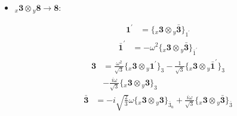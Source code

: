 \documentclass[english]{article}
\newcommand{\rep}[1]{\mathbf{#1}}
\newcommand{\repx}[2]{{}_{#2}\mathbf{#1}}
\newcommand{\tsprodx}[2]{\repx{#1}{x}\otimes\repx{#2}{y}}
\newcommand{\subcgt}[3]{\big\{ \tsprodx{#1}{#2}\big\}^{}_{#3}}
\begin{document}
\begin{itemize}
\begin{fleqn}
\end{fleqn}
\item $\tsprodx{3}{8}\to\rep{8}$:
\begin{fleqn}
\begin{align*}
\rep{1^{\prime}} & = \subcgt{3}{\bar{3}}{1^{\prime}}
\end{align*}
\begin{align*}
\rep{\bar{1}^{\prime}} & = -\omega ^2\subcgt{3}{\bar{3}}{\bar{1}^{\prime}}
\end{align*}
\begin{align*}
\rep{3} & = \frac{\omega ^2}{\sqrt{3}}\subcgt{3}{1^{\prime}}{3}-\frac{1}{\sqrt{3}}\subcgt{3}{\bar{1}^{\prime}}{3} \\ 
 & -\frac{i \omega }{\sqrt{3}}\subcgt{3}{3}{3}
\end{align*}
\begin{align*}
\rep{\bar{3}} & = -i \sqrt{\frac{2}{3}} \omega\subcgt{3}{3}{\bar{3}_{a}}+\frac{i \omega }{\sqrt{3}}\subcgt{3}{\bar{3}}{\bar{3}}
\end{align*}
\end{fleqn}
\end{itemize}
\end{document}
